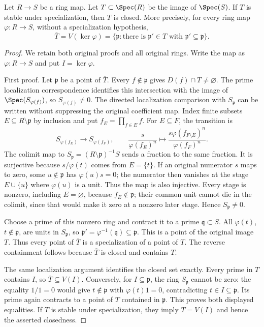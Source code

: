 \begin{lemma}
\label{lemma-image-stable-specialization-closed}
Let $R \to S$ be a ring map. Let $T \subset \Spec(R)$
be the image of $\Spec(S)$. If $T$ is stable under specialization,
then $T$ is closed. More precisely, for every ring map
$\varphi:R\to S$, without a specialization hypothesis,
$$
\overline T=V(\ker\varphi)
=\{\mathfrak p:\text{there is }\mathfrak p'\in T
\text{ with }\mathfrak p'\subseteq\mathfrak p\}.
$$
\end{lemma}

\begin{proof}
We retain both original proofs and all original rings.
Write the map as $\varphi:R\to S$ and put $I=\ker\varphi$.

\medskip\noindent
First proof. Let $\mathfrak p$ be a point of $\overline T$.
Every $f\notin\mathfrak p$ gives $D(f)\cap T\ne\varnothing$.
The prime localization correspondence identifies this
intersection with the image of $\Spec(S_{\varphi(f)})$,
so $S_{\varphi(f)}\ne0$.
The directed localization comparison with $S_{\mathfrak p}$
can be written without suppressing the original coefficient map.
Index finite subsets $E\subseteq R\setminus\mathfrak p$
by inclusion and put $f_E=\prod_{f\in E}f$.
For $E\subseteq F$, the transition is
$$
S_{\varphi(f_E)}\longrightarrow S_{\varphi(f_F)},\qquad
\frac{s}{\varphi(f_E)^n}\longmapsto
\frac{s\varphi(f_{F\setminus E})^n}{\varphi(f_F)^n}.
$$
The colimit map to $S_{\mathfrak p}=(R\setminus\mathfrak p)^{-1}S$
sends a fraction to the same fraction. It is surjective
because $s/\varphi(t)$ comes from $E=\{t\}$.
If an original numerator $s$ maps to zero, some
$u\notin\mathfrak p$ has $\varphi(u)s=0$; the numerator
then vanishes at the stage $E\cup\{u\}$ where
$\varphi(u)$ is a unit. Thus the map is also injective.
Every stage is nonzero, including $E=\varnothing$,
because $f_E\notin\mathfrak p$; their common unit
cannot die in the colimit, since that would make it
zero at a nonzero later stage. Hence $S_{\mathfrak p}\ne0$.

Choose a prime of this nonzero ring and contract it
to a prime $\mathfrak q\subset S$. All
$\varphi(t)$, $t\notin\mathfrak p$, are units in
$S_{\mathfrak p}$, so
$\mathfrak p'=\varphi^{-1}(\mathfrak q)\subseteq\mathfrak p$.
This is a point of the original image $T$.
Thus every point of $\overline T$ is a specialization
of a point of $T$. The reverse containment follows
because $\overline T$ is closed and contains $T$.

The same localization argument identifies the closed set
exactly. Every prime in $T$ contains $I$, so
$\overline T\subseteq V(I)$. Conversely, for
$I\subseteq\mathfrak p$, the ring $S_{\mathfrak p}$
cannot be zero: the equality $1/1=0$ would give
$t\notin\mathfrak p$ with $\varphi(t)1=0$,
contradicting $t\in I\subseteq\mathfrak p$.
Its prime again contracts to a point of $T$ contained
in $\mathfrak p$. This proves both displayed equalities.
If $T$ is stable under specialization, they imply
$T=V(I)$ and hence the asserted closedness.


\end{proof}

